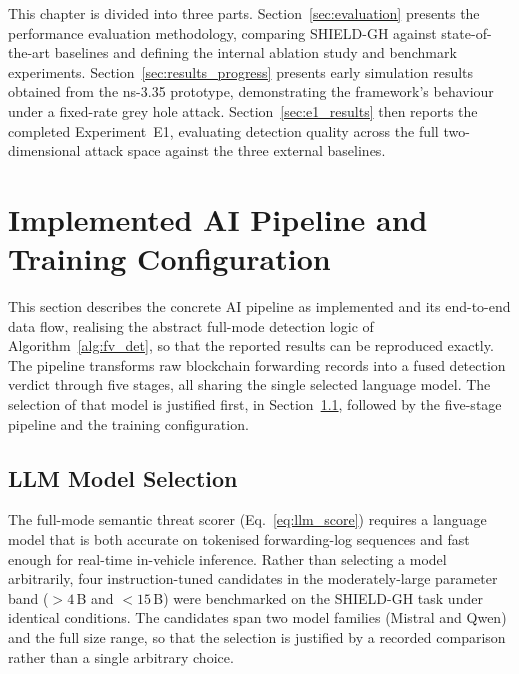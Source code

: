 \documentclass[12pt, a4paper]{report}
\begin{document}
This chapter is divided into three parts. Section~\ref{sec:evaluation}
presents the performance evaluation methodology, comparing SHIELD-GH against
state-of-the-art baselines and defining the internal ablation study and
benchmark experiments. Section~\ref{sec:results_progress} presents
early simulation results obtained from the ns-3.35 prototype, demonstrating
the framework's behaviour under a fixed-rate grey hole attack.
Section~\ref{sec:e1_results} then reports the completed Experiment~E1,
evaluating detection quality across the full two-dimensional attack space
against the three external baselines.

\section{Implemented AI Pipeline and Training Configuration}
\label{sec:ai_pipeline_impl}

This section describes the concrete AI pipeline as implemented and its end-to-end
data flow, realising the abstract full-mode detection logic of
Algorithm~\ref{alg:fv_det}, so that the reported results can be reproduced
exactly. The pipeline transforms raw blockchain forwarding records into a fused
detection verdict through five stages, all sharing the single selected language
model. The selection of that model is justified first, in
Section~\ref{sec:llm_selection}, followed by the five-stage pipeline and the
training configuration.

\subsection{LLM Model Selection}
\label{sec:llm_selection}

The full-mode semantic threat scorer (Eq.~\eqref{eq:llm_score}) requires a
language model that is both accurate on tokenised forwarding-log sequences and
fast enough for real-time in-vehicle inference. Rather than selecting a model
arbitrarily, four instruction-tuned candidates in the moderately-large parameter
band ($>4$\,B and $<15$\,B) were benchmarked on the SHIELD-GH task under
identical conditions. The candidates span two model families (Mistral and Qwen)
and the full size range, so that the selection is justified by a recorded
comparison rather than a single arbitrary choice.
\end{document}
